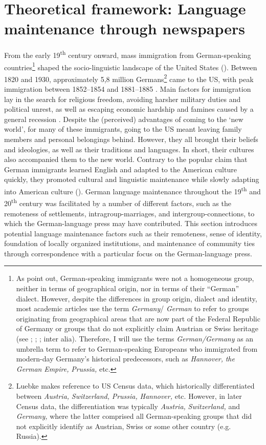 \documentclass[output=paper]{langsci/langscibook}
\begin{document}
\section{Theoretical framework: Language maintenance through newspapers} %
\label{sec:rocker:2}

From the early 19\textsuperscript{th} century onward, mass immigration from German-speaking countries\footnote{As \citet[29]{PutnamSalmons2015} point out, German-speaking immigrants were not a homogeneous group, neither in terms of geographical origin, nor in terms of their “German” dialect. However, despite the differences in group origin, dialect and identity, most academic articles use the term \textit{Germany}/ \textit{German} to refer to groups originating from geographical areas that are now part of the Federal Republic of Germany or groups that do not explicitly claim Austrian or Swiss heritage (see \citealt{Schwartzkopff1987}; \citealt{Boas2002}; \citealt{PutnamSalmons2015}; inter alia). Therefore, I will use the terms \textit{German/Germany} as an umbrella term to refer to German-speaking Europeans who immigrated from modern-day Germany’s historical predecessors, such as \textit{Hannover,} \textit{the} \textit{German} \textit{Empire,} \textit{Prussia,} etc. } shaped the socio-linguistic landscape of the United States (\citealt{PutnamSalmons2015}). Between 1820 and 1930, approximately 5,8 million Germans\footnote{Luebke makes reference to US Census data, which historically differentiated between \textit{Austria,} \textit{Switzerland,} \textit{Prussia,} \textit{Hannover,} etc. However, in later Census data, the differentiation was typically \textit{Austria,} \textit{Switzerland,} and \textit{Germany,} where the latter comprised all German-speaking groups that did not explicitly identify as Austrian, Swiss or some other country (e.g. Russia).} came to the US, with peak immigration between 1852--1854 and 1881--1885 \citep[95]{Luebke1990}. Main factors for immigration lay in the search for religious freedom, avoiding harsher military duties and political unrest, as well as escaping economic hardship and famines caused by a general recession \citep[37]{Jacob2002}. Despite the (perceived) advantages of coming to the ‘new world’, for many of these immigrants, going to the US meant leaving family members and personal belongings behind. However, they all brought their beliefs and ideologies, as well as their traditions and languages. In short, their cultures also accompanied them to the new world. Contrary to the popular claim that German immigrants learned English and adapted to the American culture quickly, they promoted cultural and linguistic maintenance while slowly adapting into American culture (\citealt{WilkersonSalmons2008}). German language maintenance throughout the 19\textsuperscript{th} and 20\textsuperscript{th} century was facilitated by a number of different factors, such as the remoteness of settlements, intragroup-marriages, and intergroup-connections, to which the German-language press may have contributed. This section introduces potential language maintenance factors such as their remoteness, sense of identity, foundation of locally organized institutions, and maintenance of community ties through correspondence with a particular focus on the German-language press. 
\end{document}

